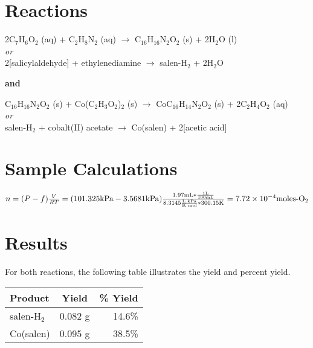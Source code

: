 \documentclass[11pt]{article}
\newcommand{\sub}[1]{\ensuremath{_{\textrm{#1}}}}
\begin{document}
\section{Reactions}
\begin{center}
2C\sub{7}H\sub{6}O\sub{2} (aq) + C\sub{2}H\sub{8}N\sub{2} (aq) $\rightarrow$ C\sub{16}H\sub{16}N\sub{2}O\sub{2} (s) + 2H\sub{2}O (l) \\
\textit{or} \\
2[salicylaldehyde] + ethylenediamine $\rightarrow$ salen-H\sub{2} + 2H\sub{2}O \bigskip

\textbf{and} \bigskip

C\sub{16}H\sub{16}N\sub{2}O\sub{2} (s) + Co(C\sub{2}H\sub{3}O\sub{2})\sub{2} (s) $\rightarrow$ CoC\sub{16}H\sub{14}N\sub{2}O\sub{2} (s) + 2C\sub{2}H\sub{4}O\sub{2} (aq) \\
\textit{or} \\
salen-H\sub{2} + cobalt(II) acetate $\rightarrow$ Co(salen) + 2[acetic acid]
\end{center}


\section{Sample Calculations}
\begin{center}
$n = (P - f) \frac{V}{RT} = (101.325 \textrm{kPa} - 3.5681 \textrm{kPa}) \frac{1.97 \textrm{mL} * \frac{1 \textrm{L}}{100 \textrm{mL}}}{8.3145 \frac{\textrm{L kPa}}{\textrm{K mol}} * 300.15 \textrm{K}} = 7.72\times10^{-4} \textrm{moles-O\sub{2}}$
\end{center}


\section{Results}
For both reactions, the following table illustrates the yield and percent yield.

\begin{center}
\begin{tabular}{|l|c|r|}
\hline
\textbf{Product} & \textbf{Yield} & \textbf{\% Yield} \\
\hline
salen-H\sub{2} & 0.082 g & 14.6\% \\
Co(salen) & 0.095 g & 38.5\% \\
\hline
\end{tabular}
\end{center}
\end{document}
